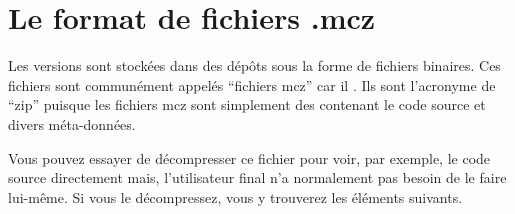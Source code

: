 \documentclass[a4paper,10pt,twoside]{book}
\begin{document}



\section{Le format de fichiers .mcz}

Les versions sont stockées dans des dépôts sous la forme de fichiers
binaires. Ces fichiers sont communément appelés ``fichiers mcz'' car
il . %
Ils sont l'acronyme de 
 ``\MC zip'' puisque les fichiers mcz sont simplement des  contenant le code source et divers
méta-données.



Vous pouvez essayer de décompresser ce fichier pour voir, par exemple,
le code source directement mais, l'utilisateur final n'a normalement
pas besoin de le faire lui-même.
Si vous le décompressez, vous y trouverez les éléments suivants.
\end{document}
